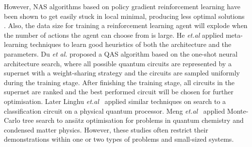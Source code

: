 \documentclass[a4paper,onecolumn,11pt]{quantumarticle}
\begin{document}
However, NAS algorithms based on policy gradient reinforcement learning have been shown to get easily stuck in local minimal, producing less optimal solutions \cite{ENASpmlr-v80-pham18a, Sutton1999-nj}. Also, the data size for training a reinforcement learning agent will explode when the number of actions the agent can choose from is large. He \textit{et.al} \cite{chen2021quantum} applied meta-learning techniques to learn good heuristics of both the architecture and the parameters. Du \textit{et al.}  \cite{du2020quantum} proposed a QAS algorithm based on the one-shot neural architecture search, where all possible quantum circuits are represented by a supernet with a weight-sharing strategy and the circuits are sampled uniformly during the training stage. After finishing the training stage, all circuits in the supernet are ranked and the best performed circuit will be chosen for further optimisation. Later Linghu \textit{et.al}~\cite{Linghu2022-yy} applied similar techniques on search to a classification circuit on a physical quantum processor. Meng \textit{et.al}~\cite{9566740mctsqas} applied Monte-Carlo tree search to ans\"atz optimisation for problems in quantum chemistry and condensed matter physics. However, these studies often restrict their demonstrations within one or two types of problems and small-sized systems.



\end{document}
